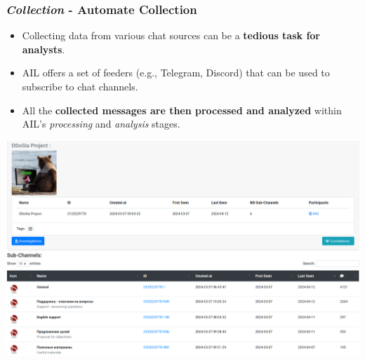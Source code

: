 \documentclass{beamer}
\begin{document}
\begin{frame}
    \frametitle{\textit{Collection} - Automate Collection}
    \begin{itemize}
        \item Collecting data from various chat sources can be a \textbf{tedious task for analysts}.
        \item AIL offers a set of feeders (e.g., Telegram, Discord) that can be used to subscribe to chat channels.
        \item All the \textbf{collected messages are then processed and analyzed} within AIL's \textit{processing} and \textit{analysis} stages.
    \end{itemize}
    \begin{center}
        \includegraphics[scale=0.18]{screenshot/chat-forum.png}
    \end{center}
\end{frame}

\end{document}
